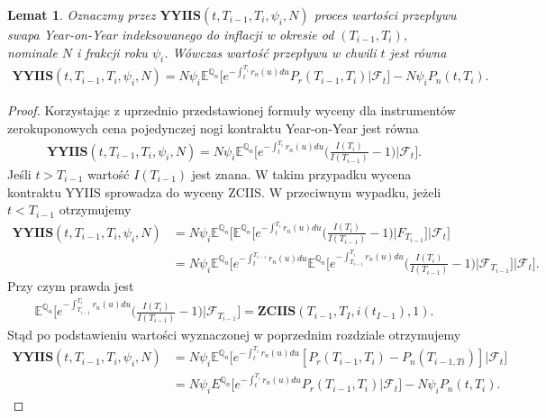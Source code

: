 \documentclass{mini}
\theoremstyle{mythstyle}
\newtheorem{Lemat}{Lemat}[chapter]
\begin{document}
	\begin{Lemat}
			Oznaczmy przez $\textbf{YYIIS}(t,T_{i-1},T_{i},\psi_i,N)$ proces wartości przepływu swapa Year-on-Year indeksowanego do inflacji w okresie od $(T_{i-1}, T_i)$, nominale $N$ i frakcji roku $\psi_i$. Wówczas wartość przepływu w chwili $t$ jest równa
			\begin{eqnarray}
			\textbf{YYIIS} (t,T_{i-1},T_i,\psi_i,N) = N \psi_i \mathbb{E}^{\mathbb{Q}_n} \bigg[ e^{-\int_t^{T_i}r_n(u)du} P_r(T_{i-1},T_i) \bigg| \mathcal{F}_t \bigg] - N \psi_i P_n(t,T_i). 
			\end{eqnarray}
	\end{Lemat}
	\begin{proof}
		Korzystając z uprzednio przedstawionej formuły wyceny dla instrumentów zerokuponowych cena pojedynczej nogi kontraktu Year-on-Year jest równa
		\begin{eqnarray}
			\textbf{YYIIS} (t,T_{i-1},T_i,\psi_i,N) = N \psi_i \mathbb{E}^{\mathbb{Q}_n} \bigg[e^{-\int_t^{T_i}r_n(u)du}\bigg(\frac{I(T_i)}{I(T_{i-1})}-1\bigg) \bigg| \mathcal{F}_t\bigg].
		\end{eqnarray}
		Jeśli $t > T_{i-1}$ wartość $I(T_{i-1})$ jest znana. W takim przypadku wycena kontraktu YYIIS sprowadza do wyceny ZCIIS. W przeciwnym wypadku, jeżeli $t < T_{i-1}$ otrzymujemy
		\begin{align*}
		\textbf{YYIIS} (t,T_{i-1},T_i,\psi_i,N) &= N \psi_i \mathbb{E}^{\mathbb{Q}_n} \bigg[ \mathbb{E}^{\mathbb{Q}_n} \bigg[e^{-\int_t^{T_i}r_n(u)du}\bigg(\frac{I(T_i)}{I(T_{i-1})}-1\bigg) \bigg| F_{T_{i-1}}\bigg] \bigg| \mathcal{F}_t \bigg]\\
		&= N \psi_i \mathbb{E}^{\mathbb{Q}_n} \bigg[ e^{-\int_t^{T_{i-1}}r_n(u)du} \mathbb{E}^{\mathbb{Q}_n} \bigg[e^{-\int_{T_{i-1}}^{T_i}r_n(u)du}\bigg(\frac{I(T_i)}{I(T_{i-1})}-1\bigg) \bigg| \mathcal{F}_{T_{i-1}}\bigg] \bigg| \mathcal{F}_t \bigg].
		\end{align*}
		Przy czym prawda jest
		\begin{eqnarray*}
			\mathbb{E}^{\mathbb{Q}_n} \bigg[e^{-\int_{T_{i-1}}^{T_i}r_n(u)du}\bigg(\frac{I(T_i)}{I(T_{i-1})}-1\bigg) \bigg| \mathcal{F}_{T_{i-1}}\bigg] = \textbf{ZCIIS} (T_{i-1},T_I,i(t_{I-1}),1).
		\end{eqnarray*}
		Stąd po podstawieniu wartości wyznaczonej w poprzednim rozdziale otrzymujemy
		\begin{align*}
		\textbf{YYIIS} (t,T_{i-1},T_i,\psi_i,N) &= N \psi_i \mathbb{E}^{\mathbb{Q}_n} \bigg[ e^{-\int_t^{T_i}r_n(u)du} [P_r(T_{i-1},T_i) - P_n(T_{i-1,Ti})] \bigg| \mathcal{F}_t \bigg]\\
		&= N \psi_i E^{\mathbb{Q}_n} \bigg[ e^{-\int_t^{T_i}r_n(u)du} P_r(T_{i-1},T_i) \bigg| \mathcal{F}_t \bigg] - N \psi_i P_n(t,T_i). 
		\end{align*}
	\end{proof}
\end{document}
